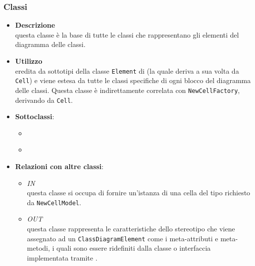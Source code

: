 \subsubsection{Classi}
\label{\nogloxy{swedesigner::client::model::celltypes::class::ClassDiagramElement}}
\begin{figure}[h]
\centering
{}
\caption{}
\end{figure}
\FloatBarrier
\begin{itemize}
\item \textbf{Descrizione}\\
questa classe è la base di tutte le classi che rappresentano gli elementi del diagramma delle classi.
\item \textbf{Utilizzo}\\
eredita da sottotipi della classe \texttt{Element} di \jointjs{} (la quale deriva a sua volta da \texttt{Cell}) e viene estesa da tutte le classi specifiche di ogni blocco del diagramma delle classi. Questa classe è indirettamente correlata con \texttt{NewCellFactory}, derivando da \texttt{Cell}.
\item \textbf{Sottoclassi}:
\begin{itemize}
\item \hyperref[\nogloxy{swedesigner::client::model::celltypes::class::HxClass}]{}
\item \hyperref[\nogloxy{swedesigner::client::model::celltypes::class::HxInterface}]{}
\end{itemize}
\item \textbf{Relazioni con altre classi}:
\begin{itemize}
\item \textit{IN} \hyperref[\nogloxy{swedesigner::client::model::NewCellFactory}]{}\\
questa classe si occupa di fornire un'istanza di una cella del tipo richiesto da \texttt{NewCellModel}. 
\item \textit{OUT} \hyperref[\nogloxy{swedesigner::client::model::celltypes::HxStereotype}]{}\\
questa classe rappresenta le caratteristiche dello stereotipo che viene assegnato ad un \texttt{ClassDiagramElement} come i meta-attributi e meta-metodi, i quali sono essere ridefiniti dalla classe o interfaccia implementata tramite \proj{}. 

\end{itemize}
\end{itemize}
